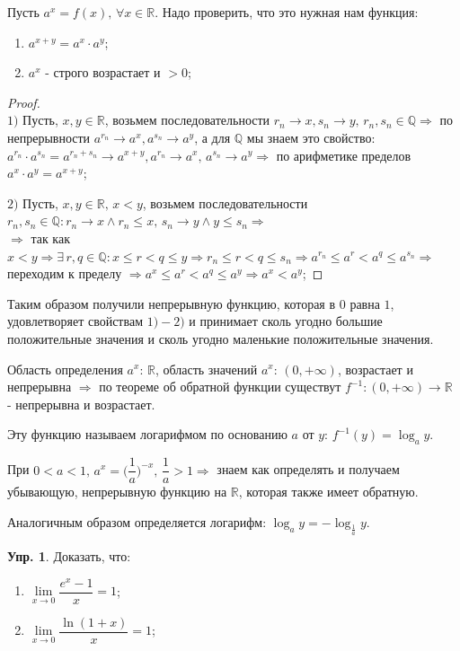 \documentclass[12pt]{article}
\newcommand{\MR}{\mathbb{R}}
\newcommand{\MQ}{\mathbb{Q}}
\theoremstyle{definition}
\newtheorem{exrc}{Упр.}
\begin{document}
Пусть $a^x = f(x), \, \forall x \in \MR$. Надо проверить, что это нужная нам функция:
\begin{enumerate}[label={\arabic*)}]
	\item $a^{x+y} = a^x{\cdot}a^y$;
	\item $a^x$ - строго возрастает и $>0$;
\end{enumerate}

\begin{proof}\hfill\\
	$1)$ Пусть, $x,y \in \MR$, возьмем последовательности $r_n \to x, s_n \to y, \, r_n, s_n \in \MQ \Rightarrow$ по непрерывности $a^{r_n} \to a^x, a^{s_n} \to a^y$, а для $\MQ$ мы знаем это свойство: $a^{r_n} \cdot a^{s_n} = a^{r_n + s_n} \to a^{x+y}, a^{r_n} \to a^x, \, a^{s_n} \to a^y \Rightarrow$ по арифметике пределов $a^x{\cdot}a^y = a^{x+y}$;
		
	$2)$ Пусть, $x,y \in \MR, \, x < y$, возьмем последовательности $r_n, s_n \in \MQ \colon r_n \to x \wedge r_n \leq x, \, s_n \to y \wedge y \leq s_n  \Rightarrow$\\
	$\Rightarrow$ так как $x < y \Rightarrow \exists \, r,q \in \MQ \colon x \leq r < q \leq y \Rightarrow r_n \leq r < q \leq s_n \Rightarrow a^{r_n} \leq a^r < a^q \leq  a^{s_n} \Rightarrow$ переходим к пределу $\Rightarrow a^x \leq a^r < a^q \leq a^y \Rightarrow a^x < a^y$;
\end{proof}

Таким образом получили непрерывную функцию, которая в $0$ равна $1$, удовлетворяет свойствам $1)-2)$ и принимает сколь угодно большие положительные значения и сколь угодно маленькие положительные значения.

Область определения $a^x$: $\MR$, область значений $a^x$: $(0, +\infty)$, возрастает и непрерывна $\Rightarrow$ по теореме об обратной функции существут $f^{-1}\colon (0, +\infty) \to \MR$ - непрерывна и возрастает. 

Эту функцию называем логарифмом по основанию $a$ от $y$: $f^{-1}(y) = \log_a{y}$.

При $0 < a < 1, \, a^x = \Big(\dfrac{1}{a} \Big)^{-x}, \, \dfrac{1}{a} > 1 \Rightarrow$ знаем как определять и получаем убывающую, непрерывную функцию на $\MR$, которая также имеет обратную.

Аналогичным образом определяется логарифм: $\log_a y = -\log_{\frac{1}{a}}y$.

\begin{exrc}
	Доказать, что:
	\begin{enumerate}[label={(\arabic*)}]
		\item $\lim\limits_{x \to 0}\dfrac{e^x-1}{x}=1$;
		\item $\lim\limits_{x \to 0}\dfrac{\ln(1+x)}{x}=1$;
	\end{enumerate}
\end{exrc}
\end{document}
